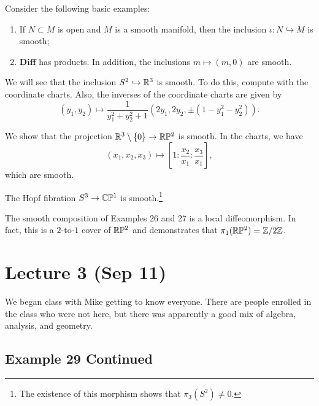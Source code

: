 \documentclass[twoside, 10pt]{article}
\begin{document}
    \begin{exm} Consider the following basic examples: \begin{enumerate} \item
        If $N \subset M$ is open and $M$ is a smooth manifold, then the
        inclusion $\iota:N \hookrightarrow M$ is smooth; \item $\mathbf{Diff}$
        has products. In addition, the inclusions $m \mapsto (m,0)$ are smooth.
\end{enumerate} \end{exm}

    \begin{exm} We will see that the inclusion $S^2 \hookrightarrow \mathbb{R}^3$ is
        smooth. To do this, compute with the coordinate charts. Also, the
        inverses of the coordinate charts are given by \[ (y_1, y_2) \mapsto
        \frac{1}{y_1^2+y_2^2+1} (2y_1, 2y_2, \pm(1-y_1^2-y_2^2)).\] \end{exm}

    \begin{exm} We show that the projection $\mathbb{R}^3 \setminus \{0\} \to \mathbb{R}\mathbb{P}^2$
        is smooth. In the charts, we have \[(x_1, x_2, x_3) \mapsto \left[ 1:
        \frac{x_2}{x_1} : \frac{x_3}{x_1} \right], \] which are smooth.
    \end{exm}

    \begin{exm} The Hopf fibration $S^3 \to \mathbb{C}\mathbb{P}^1$ is smooth.\footnote{The
    existence of this morphism shows that $\pi_3(S^2) \neq 0$.} \end{exm}

    \begin{exm} The smooth composition of Examples 26 and 27 is a local
    diffeomorphism. In fact, this is a $2$-to-$1$ cover of $\mathbb{R}\mathbb{P}^2$ and
demonstrates that $\pi_1(\mathbb{R}\mathbb{P}^2) = \mathbb{Z}/2\mathbb{Z}$.  \end{exm}

    \section{Lecture 3 (Sep 11)}%

    We began class with Mike getting to know everyone. There are people
    enrolled in the class who were not here, but there was apparently a good
    mix of algebra, analysis, and geometry.

    \subsection{Example 29 Continued}%
    
\end{document}
